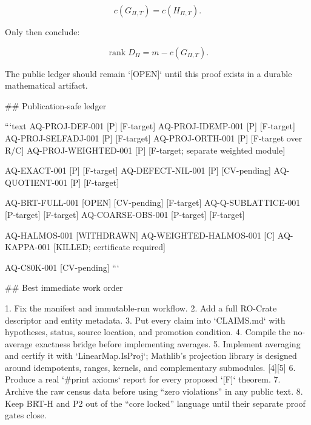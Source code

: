 $$
c(G_{\Pi,T})=c(H_{\Pi,T}).
$$

Only then conclude:

$$
\boxed{
\operatorname{rank}D_\Pi
=
m-c(G_{\Pi,T}).
}
$$

The public ledger should remain `[OPEN]` until this proof exists in a durable mathematical artifact.

## Publication-safe ledger

```text
AQ-PROJ-DEF-001        [P] [F-target]
AQ-PROJ-IDEMP-001      [P] [F-target]
AQ-PROJ-SELFADJ-001    [P] [F-target]
AQ-PROJ-ORTH-001       [P] [F-target over R/C]
AQ-PROJ-WEIGHTED-001   [P] [F-target; separate weighted module]

AQ-EXACT-001           [P] [F-target]
AQ-DEFECT-NIL-001      [P] [CV-pending]
AQ-QUOTIENT-001        [P] [F-target]

AQ-BRT-FULL-001        [OPEN] [CV-pending] [F-target]
AQ-Q-SUBLATTICE-001    [P-target] [F-target]
AQ-COARSE-OBS-001      [P-target] [F-target]

AQ-HALMOS-001          [WITHDRAWN]
AQ-WEIGHTED-HALMOS-001 [C]
AQ-KAPPA-001           [KILLED; certificate required]

AQ-C80K-001            [CV-pending]
```

## Best immediate work order

1. Fix the manifest and immutable-run workflow.
2. Add a full RO-Crate descriptor and entity metadata.
3. Put every claim into `CLAIMS.md` with hypotheses, status, source location, and promotion condition.
4. Compile the no-average exactness bridge before implementing averages.
5. Implement averaging and certify it with `LinearMap.IsProj`; Mathlib’s projection library is designed around idempotents, ranges, kernels, and complementary submodules. [4][5]
6. Produce a real `#print axioms` report for every proposed `[F]` theorem.
7. Archive the raw census data before using “zero violations” in any public text.
8. Keep BRT-H and P2 out of the “core locked” language until their separate proof gates close.

